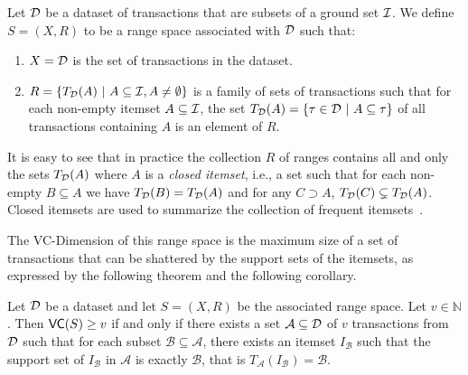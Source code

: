 \begin{definition}
  Let ${\cal D}$ be a dataset of transactions that are subsets of a ground set
  ${\cal I}$.  We define $S=(X,R)$ to be a range space associated with ${\cal D}$ such
  that:
  \begin{enumerate}
    \item $X={\cal D}$ is the set of transactions in the dataset.
    \item $R=\{T_{\cal D}(A) ~|~ A\subseteq {\cal I}, A\neq\emptyset\}$ is a family of
      sets of transactions such that for each non-empty itemset
      $A\subseteq{\cal I}$, the set $T_{\cal D}(A)=\{\tau\in{\cal D} ~|~ A\subseteq\tau\}$ of
      all transactions containing $A$ is an element of $R$.
  \end{enumerate}
\end{definition}

It is easy to see that in practice the collection $R$ of ranges contains all and only
the sets $T_{\cal D}(A)$ where $A$ is a \emph{closed itemset}, i.e., a set such that
for each non-empty $B\subseteq A$ we have $T_{\cal D}(B)=T_{\cal D}(A)$ and for any
$C\supset A$, $T_{\cal D}(C)\subsetneq T_{\cal D}(A)$. Closed itemsets are used to
summarize the collection of frequent itemsets~\citep{CaldersRB06}.

The VC-Dimension of this range space is the maximum size of a set of
transactions that can be shattered by the support sets of the itemsets, as
expressed by the following theorem and the following corollary.

\begin{theorem}
  Let ${\cal D}$ be a dataset and let $S=(X,R)$ be the associated range
  space. Let $v\in\mathbb{N}$. Then $\mathsf{VC}(S)\ge v$ if and only if there exists a
  set $\mathcal{A}\subseteq{\cal D}$ of $v$ transactions from ${\cal D}$ such that for
  each subset $\mathcal{B}\subseteq\mathcal{A}$, there exists an itemset
  $I_\mathcal{B}$ such that the support set
  of $I_\mathcal{B}$ in $\mathcal{A}$ is exactly $\mathcal{B}$, that is
  $T_\mathcal{A}(I_\mathcal{B})=\mathcal{B}$.
\end{theorem}

